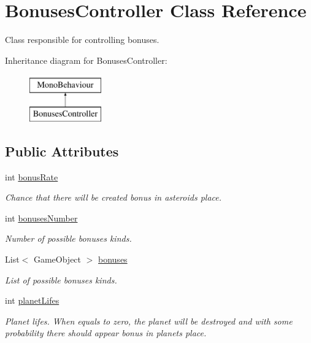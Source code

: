 \hypertarget{class_bonuses_controller}{}\section{Bonuses\+Controller Class Reference}
\label{class_bonuses_controller}


Class responsible for controlling bonuses.  


Inheritance diagram for Bonuses\+Controller\+:\begin{figure}[H]
\begin{center}
\leavevmode
\includegraphics[height=2.000000cm]{class_bonuses_controller}
\end{center}
\end{figure}
\subsection*{Public Attributes}
\begin{DoxyCompactItemize}
\item 
int \mbox{\hyperlink{class_bonuses_controller_a01de764707e69ec225d62563fc683cd5}{bonus\+Rate}}
\begin{DoxyCompactList}\small\item\em Chance that there will be created bonus in asteroid\textquotesingle{}s place. \end{DoxyCompactList}\item 
int \mbox{\hyperlink{class_bonuses_controller_a5832f0f45d1b3f889da0fd3eafcfd054}{bonuses\+Number}}
\begin{DoxyCompactList}\small\item\em Number of possible bonuses kinds. \end{DoxyCompactList}\item 
List$<$ Game\+Object $>$ \mbox{\hyperlink{class_bonuses_controller_adb877f81531327caebb69f2f2aa292f1}{bonuses}}
\begin{DoxyCompactList}\small\item\em List of possible bonuses kinds. \end{DoxyCompactList}\item 
int \mbox{\hyperlink{class_bonuses_controller_a14eaa862f70cb157749cb0978ef5bd96}{planet\+Lifes}}
\begin{DoxyCompactList}\small\item\em Planet lifes. When equals to zero, the planet will be destroyed and with some probability there should appear bonus in planet\textquotesingle{}s place. \end{DoxyCompactList}\end{DoxyCompactItemize}


